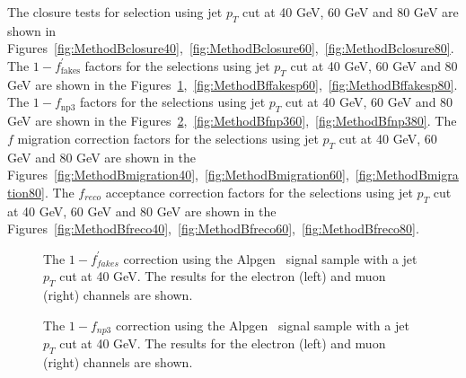 The closure tests for selection using jet $p_T$ cut at 40 GeV, 60 GeV and 80 GeV are shown in Figures~\ref{fig:MethodBclosure40},~\ref{fig:MethodBclosure60},~\ref{fig:MethodBclosure80}.
The $1 - f^{\prime}_{\mathrm{fakes}}$ factors for the selections using jet $p_T$ cut at 40 GeV, 60 GeV and 80 GeV are shown in the Figures~\ref{fig:MethodBffakesp40},~\ref{fig:MethodBffakesp60},~\ref{fig:MethodBffakesp80}.
The $1 - f_{\mathrm{np3}}$ factors for the selections using jet $p_T$ cut at 40 GeV, 60 GeV and 80 GeV are shown in the Figures~\ref{fig:MethodBfnp340},~\ref{fig:MethodBfnp360},~\ref{fig:MethodBfnp380}.
The $f$ migration correction factors for the selections using jet $p_T$ cut at 40 GeV, 60 GeV and 80 GeV are shown in the Figures~\ref{fig:MethodBmigration40},~\ref{fig:MethodBmigration60},~\ref{fig:MethodBmigration80}.
The $f_{reco}$ acceptance correction factors for the selections using jet $p_T$ cut at 40 GeV, 60 GeV and 80 GeV are shown in the Figures~\ref{fig:MethodBfreco40},~\ref{fig:MethodBfreco60},~\ref{fig:MethodBfreco80}.


\begin{sidewaysfigure}[htbp]
\centering
{}
\caption{The closure test using the Alpgen  \ttbar\ signal sample for input and corrections with a jet $p_T$
  cut at 40 GeV for the selection.  The
  results for the electron (left) and muon (right) channels are shown.}
\label{fig:MethodBclosure40}
\end{sidewaysfigure}

\begin{figure}[htbp]
\centering
{}
\caption{The $1 - f^{\prime}_{fakes}$ correction using the Alpgen \ttbar\ signal sample with a jet $p_T$ cut at 40 GeV.  The results for the electron (left) and muon (right) channels are shown.}
\label{fig:MethodBffakesp40}
\end{figure}


\begin{figure}[htbp]
\centering
{}
\caption{The $1 - f_{np3}$ correction using the Alpgen \ttbar\ signal sample with a jet $p_T$ cut at 40 GeV.  The results for the electron (left) and muon (right) channels are shown.}
\label{fig:MethodBfnp340}
\end{figure}


